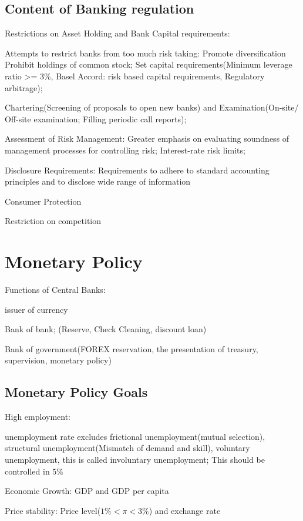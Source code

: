 \documentclass[10pt, a4paper]{article}
\begin{document}
    \subsection{Content of Banking regulation}
        Restrictions on Asset Holding and Bank Capital requirements: 

        \quad Attempts to restrict banks from too much risk taking: Promote diversification Prohibit holdings of common stock; Set capital requirements(Minimum leverage ratio >= 3\%, Basel Accord: risk based capital requirements, Regulatory arbitrage);

        \quad Chartering(Screening of proposals to open new banks) and Examination(On-site/ Off-site examination; Filling periodic call reports);
        
        \quad Assessment of Risk Management: Greater emphasis on evaluating soundness of management processes for controlling risk; Interest-rate risk limits;
        
        \quad Disclosure Requirements: Requirements to adhere to standard accounting principles and to disclose wide range of information 

        \quad Consumer Protection

        \quad Restriction on competition

\section{Monetary Policy}
Functions of Central Banks: 

\quad  issuer of currency 

\quad Bank of bank; (Reserve, Check Cleaning, discount loan)

\quad Bank of government(FOREX reservation, the presentation of treasury, supervision, monetary policy)

    \subsection{Monetary Policy Goals}
        High employment: 

             \quad unemployment rate excludes frictional unemployment(mutual selection), structural unemployment(Mismatch of demand and skill), voluntary unemployment, this is called involuntary unemployment; This should be controlled in $5\%$ 
        
        Economic Growth: GDP and GDP per capita 
        
        Price stability: Price level($1\%<\pi<3\%$) and exchange rate 
        
\end{document}
